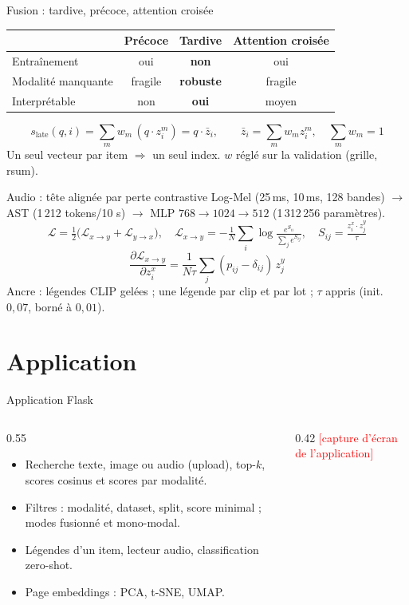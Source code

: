 \documentclass[aspectratio=169,11pt]{beamer}
\newcommand{\TODO}[1]{\textcolor{red}{[#1]}}
\begin{document}
\begin{frame}{Fusion : tardive, précoce, attention croisée}
  \small
  \begin{tabular}{@{}lccc@{}}
    \toprule
    & Précoce & \textbf{Tardive} & Attention croisée\\
    \midrule
    Entraînement & oui & \textbf{non} & oui\\
    Modalité manquante & fragile & \textbf{robuste} & fragile\\
    Interprétable & non & \textbf{oui} & moyen\\
    \bottomrule
  \end{tabular}
  \medskip
  \[
    s_{\text{late}}(q,i)=\sum_m w_m\,(q\cdot z_i^m)=q\cdot\bar z_i,\qquad \bar z_i=\sum_m w_m z_i^m,\quad \sum_m w_m=1
  \]
  Un seul vecteur par item $\Rightarrow$ un seul index. $w$ réglé sur la validation (grille, rsum).
\end{frame}

\begin{frame}{Audio : tête alignée par perte contrastive}
  \small
  Log-Mel (25\,ms, 10\,ms, 128 bandes) $\to$ AST (1\,212 tokens/10 s) $\to$ MLP $768\to1024\to512$ (1\,312\,256 paramètres).
  \[
    \mathcal L=\tfrac12\big(\mathcal L_{x\to y}+\mathcal L_{y\to x}\big),\quad
    \mathcal L_{x\to y}=-\tfrac1N\sum_i\log\tfrac{e^{S_{ii}}}{\sum_j e^{S_{ij}}},\quad S_{ij}=\tfrac{z^x_i\cdot z^y_j}{\tau}
  \]
  \[
    \frac{\partial\mathcal L_{x\to y}}{\partial z^x_i}=\frac1{N\tau}\sum_j(p_{ij}-\delta_{ij})\,z^y_j
  \]
  Ancre : légendes CLIP gelées ; une légende par clip et par lot ; $\tau$ appris (init. $0{,}07$, borné à $0{,}01$).
\end{frame}

\section{Application}
\begin{frame}{Application Flask}
  \begin{columns}[T]
    \begin{column}{0.55\textwidth}
      \begin{itemize}
        \item Recherche texte, image ou audio (upload), top-$k$, scores cosinus et scores par modalité.
        \item Filtres : modalité, dataset, split, score minimal ; modes fusionné et mono-modal.
        \item Légendes d'un item, lecteur audio, classification zero-shot.
        \item Page embeddings : PCA, t-SNE, UMAP.
      \end{itemize}
    \end{column}
    \begin{column}{0.42\textwidth}
      \TODO{capture d'écran de l'application}
    \end{column}
  \end{columns}
\end{frame}
\end{document}
